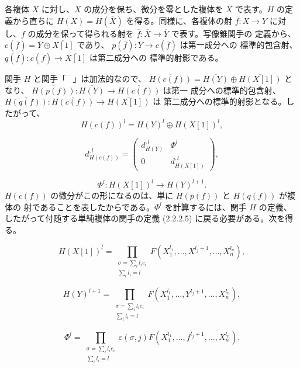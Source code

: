 \clearpage
{}%
\begingroup
\small
\setlength{\abovedisplayskip}{3pt plus 2pt minus 2pt}%
\setlength{\belowdisplayskip}{3pt plus 2pt minus 2pt}%
\setlength{\jot}{2pt}%

各複体 $X$ に対し、$X$ の成分を保ち、微分を零とした複体を
$\overline{X}$ で表す。$H$ の定義から直ちに
$\overline{H(X)}=H(\overline{X})$ を得る。同様に、各複体の射
$f\colon X\longrightarrow Y$ に対し、$f$ の成分を保って得られる射を
$\overline{f}\colon\overline{X}\longrightarrow\overline{Y}$ で表す。写像錐関手の
定義から、$c(\overline{f})=\overline{Y}\oplus\overline{X[1]}$ であり、
$p(\overline{f})\colon\overline{Y}\longrightarrow c(\overline{f})$ は第一成分への
標準的包含射、
$q(\overline{f})\colon c(\overline{f})\longrightarrow\overline{X[1]}$ は第二成分への
標準的射影である。

関手 $H$ と関手「$\overline{\phantom{X}}$」は加法的なので、
$\overline{H(c(f))}=\overline{H(Y)}\oplus\overline{H(X[1])}$ となり、
$\overline{H(p(f))}\colon\overline{H(Y)}\longrightarrow\overline{H(c(f))}$ は第一
成分への標準的包含射、
$\overline{H(q(f))}\colon\overline{H(c(f))}\longrightarrow\overline{H(X[1])}$ は
第二成分への標準的射影となる。したがって、
\[
  H(c(f))^l=H(Y)^l\oplus H(X[1])^l,
\]

\begin{equation}
  d_{H(c(f))}^{,l}=
  \begin{pmatrix}
    d_{H(Y)}^{,l} & \Phi^l\\
    0 & d_{H(X[1])}^{,l}
  \end{pmatrix},
  \tag{3.4.3.2}
\end{equation}

\[
  \Phi^l\colon H(X[1])^l\longrightarrow H(Y)^{l+1}.
\]
$H(c(f))$ の微分がこの形になるのは、単に $H(p(f))$ と $H(q(f))$ が複体の
射であることを表したからである。$\Phi^l$ を計算するには、関手 $H$ の定義、
したがって付随する単純複体の関手の定義 (2.2.2.5) に戻る必要がある。次を得る。

\[
  H(X[1])^l=
  \prod_{\substack{\sigma=\sum_i l_i e_i\\ \sum_i l_i=l}}
  F(X_1^{l_1},\ldots,X^{l_j+1},\ldots,X_n^{l_n}),
\]

\begin{equation}
  H(Y)^{l+1}=
  \prod_{\substack{\sigma=\sum_i l_i e_i\\ \sum_i l_i=l}}
  F(X_1^{l_1},\ldots,Y^{l_j+1},\ldots,X_n^{l_n}),
  \tag{3.4.3.3}
\end{equation}

\[
  \Phi^l=
  \prod_{\substack{\sigma=\sum_i l_i e_i\\ \sum_i l_i=l}}
  \varepsilon(\sigma,j)
  F(X_1^{l_1},\ldots,f^{l_j+1},\ldots,X_n^{l_n}).
\]
\endgroup
